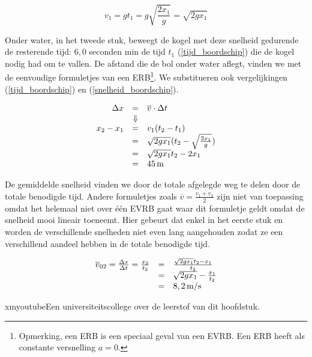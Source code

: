 \documentclass{ximera}
\begin{document}
\begin{exercise}
\begin{oplossing}
\[
v_1=gt_1\nonumber=g\sqrt{\frac{2x_1}{g}}\nonumber=\sqrt{2gx_1}
\]

Onder water, in het tweede stuk, beweegt de kogel met deze snelheid gedurende de resterende tijd: $6,0$ seconden min de tijd $t_1$ (\ref{tijd_boordschip}) die de kogel nodig had om te vallen. De afstand die de bol onder water aflegt, vinden we met de eenvoudige formuletjes van een ERB\footnote{Opmerking, een ERB is een speciaal geval van een EVRB. Een ERB heeft als constante versnelling $a=0$.}. We substitueren ook vergelijkingen (\ref{tijd_boordschip}) en (\ref{snelheid_boordschip}).

\[
\begin{array}{rcl}
\Delta x&=&\overline{v}\cdot\Delta t\\
&\Downarrow&\\
x_2-x_1&=&v_1(t_2-t_1)\\
&=&\sqrt{2gx_1}(t_2-\sqrt{\frac{2x_1}{g}})\\
&=&\sqrt{2gx_1}t_2-2x_1\\
&=&45\rm\,m
\end{array}
\]

De gemiddelde snelheid vinden we door de totale afgelegde weg te delen door de totale benodigde tijd. Andere formuletjes zoals $\overline{v}=\frac{v_1+v_2}{2}$ zijn niet van toepassing omdat het helemaal niet over \'e\'en EVRB gaat waar dit formuletje geldt omdat de snelheid mooi lineair toeneemt. Hier gebeurt dat enkel in het eerste stuk en worden de verschillende snelheden niet even lang aangehouden zodat ze een verschillend aandeel hebben in de totale benodigde tijd.

\[
\begin{array}{rcl}
\overline{v}_{02}=\frac{\Delta x}{\Delta t}=\frac{x_2}{t_2}&=&\frac{\sqrt{2gx_1}t_2-x_1}{t_2}\\
&=&\sqrt{2gx_1}-\frac{x_1}{t_2}\\
&=&8,2\rm\,m/s
\end{array}
\]

\end{oplossing}
\end{exercise}

\begin{expandable}{xmyoutube}{Een universiteitscollege over de leerstof van dit hoofdstuk.}
\end{expandable}
\end{document}
